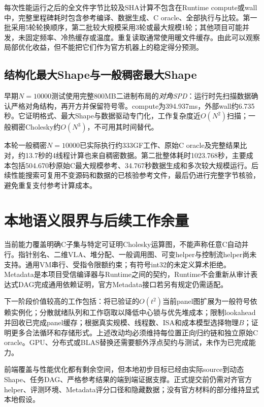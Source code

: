 \documentclass[UTF8,a4paper,11pt]{ctexart}
\begin{document}
每次性能运行之后的全文件字节比较及SHA计算不包含在Runtime compute或wall中，完整里程碑耗时包含参考编译、数据生成、C oracle、全部执行与比较。第一批采用5轮轮换顺序，第二批较大规模采用3轮或最大规模1轮；其他项目可能并发，未固定频率、冷热缓存或温度。重复读取通常使用暖文件缓存。由此可以观察局部优化收益，但不能把它们作为官方机器上的稳定得分预测。

\subsection{结构化最大Shape与一般稠密最大Shape}
早期$N=10000$测试使用完整800MB二进制布局的\emph{对角SPD}：运行时先扫描数据确认严格对角结构，再开方并保留符号零。compute为394.937ms，外部wall约6.735秒。它证明格式、最大Shape与数据驱动专门化，工作复杂度近$O(N^2)$扫描；一般稠密Cholesky约$O(N^3)$，不可用其时间替代。

本轮一般稠密$N=10000$已实际执行约333GF工作、原始C oracle及完整结果比对，约13.7秒的4线程计算也来自稠密数据。第二批整体耗时1023.768秒，主要成本包括504.670秒原始C最大规模参考、34.767秒数据生成和多次较大规模运行。后续性能搜索可复用不变源码和数据的已核验参考文件，最后仍进行完整字节核验，避免重复支付参考计算成本。

\section{本地语义限界与后续工作余量}
当前能力覆盖明确C子集与特定可证明Cholesky运算图，不能声称任意C自动并行。指针别名、二维VLA、堆分配、一般调用图、可变helper与控制流helper尚未支持。通用VM串行、受指令限额约束；有符号int32的未定义算术拒绝。Metadata是本项目受信编译器与Runtime之间的契约，Runtime不会重新从审计表达式DAG完成通用依赖证明，官方Metadata接口若另有规定仍需适配。

下一阶段价值较高的工作包括：将已验证的$O(t^2)$当前panel图扩展为一般符号依赖实例化；分散就绪队列和工作窃取以降低中心锁与优先堆成本；限制lookahead并回收已完成panel缓存；根据真实规模、线程数、ISA和成本模型选择物理$B$；证明更多合法循环和存储形式。上述改动均必须维持每位置正向归约链和独立原始C oracle。GPU、分布式或BLAS替换还需要额外浮点契约与测试，未作为已完成能力。

前端覆盖与性能优化都有剩余空间，但本地初步目标已经由实际source到动态Shape、任务DAG、严格参考结果的端到端证据支撑。正式提交前仍需对齐官方helper、评测环境、Metadata评分口径和隐藏数据；没有官方材料的部分维持显式本地假设。
\end{document}
